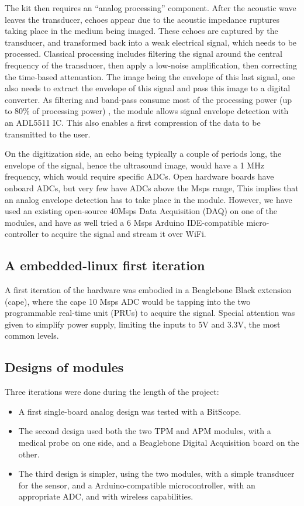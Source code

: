 \documentclass[letterpaper, 10 pt, conference]{ieeeconf} %
\begin{document}
The kit then requires an ``analog processing'' component. After the acoustic wave leaves the transducer, echoes appear due to the acoustic impedance ruptures taking place in the medium being imaged. These echoes are captured by the transducer, and transformed back into a weak electrical signal, which needs to be processed. Classical processing includes filtering the signal around the central frequency of the transducer, then apply a low-noise amplification, then correcting the time-based attenuation. The image being the envelope of this last signal, one also needs to extract the envelope of this signal and pass this image to a digital converter. As filtering and band-pass consume most of the processing power (up to 80\% of processing power) \cite{c11}, the module allows signal envelope detection with an ADL5511 IC. This also enables a first compression of the data to be transmitted to the user.

On the digitization side, an echo being typically a couple of periods long, the envelope of the signal, hence the ultrasound image, would have a 1 MHz frequency, which would require specific ADCs. Open hardware boards have onboard ADCs, but very few have ADCs above the Msps range, This implies that an analog envelope detection has to take place in the module. However, we have used an existing open-source 40Msps Data Acquisition (DAQ) on one of the modules, and have as well tried a 6 Msps Arduino IDE-compatible micro-controller to acquire the signal and stream it over WiFi.




\subsection{A embedded-linux first iteration}

A first iteration of the hardware was embodied in a Beaglebone Black extension (cape), where the cape 10 Msps ADC would be tapping into the two programmable real-time unit (PRUs) to acquire the signal. Special attention was given to simplify power supply, limiting the inputs to 5V and 3.3V, the most common levels.

\subsection{Designs of modules}

Three iterations were done during the length of the project: 

\begin{itemize} 
\item A first single-board analog design was tested with a BitScope.
\item The second design used both the two TPM and APM modules, with a medical probe on one side, and a Beaglebone Digital Acquisition board on the other.
\item The third design is simpler, using the two modules, with a simple transducer for the sensor, and a Arduino-compatible microcontroller, with an appropriate ADC, and with wireless capabilities.
\end{itemize}
\end{document}
